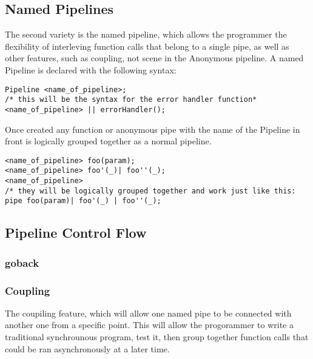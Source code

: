 \documentclass[./LRM_main.tex]{subfiles}
\begin{document}
\subsection{Named Pipelines}
The second variety is the named pipeline, which allows the programmer the flexibility of interleving function calls that belong to a single pipe, as well as other features, such as coupling, not scene in the Anonymous pipeline. A named Pipeline is declared with the following syntax:
\begin{lstlisting}
Pipeline <name_of_pipeline>;
/* this will be the syntax for the error handler function*
<name_of_pipeline> || errorHandler();
\end{lstlisting}
Once created any function or anonymous pipe with the name of the Pipeline in front is logically grouped together as a normal pipeline.
\begin{lstlisting}
<name_of_pipeline> foo(param);
<name_of_pipeline> foo'(_)| foo''(_);
<name_of_pipeline>
/* they will be logically grouped together and work just like this:
pipe foo(param)| foo'(_) | foo''(_);
\end{lstlisting}

\subsection{Pipeline Control Flow}
\subsubsection{goback}
\subsubsection{Coupling}
The coupiling feature, which will allow one named pipe to be connected with another one from a specific point. This will allow the progorammer to write a traditional synchrounous program, test it, then group together function calls that could be ran asynchronously at a later time.



\end{document}
